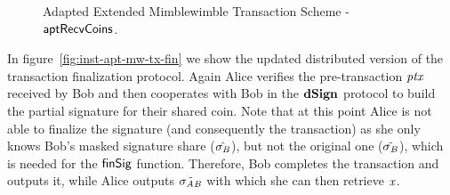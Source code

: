 \begin{figure}
    \begin{center}
    \end{center}
    \caption{Adapted Extended Mimblewimble Transaction Scheme - $\mathsf{aptRecvCoins}$. \label{fig:inst-apt-mw-tx-recv}}
\end{figure}

In figure~\cref{fig:inst-apt-mw-tx-fin} we show the updated distributed version of the transaction finalization protocol.
Again Alice verifies the pre-transaction $\mathit{ptx}$ received by Bob and then cooperates with Bob in the $\mathbf{dSign}$ protocol to build the partial signature for their shared coin.
Note that at this point Alice is not able to finalize the signature (and consequently the transaction) as she only knows Bob's masked signature share ($\hat{\sigma_{\mathit{B}}}$), but not the original one ($\tilde{\sigma_{\mathit{B}}}$), which is needed for the $\mathsf{finSig}$ function.
Therefore, Bob completes the transaction and outputs it, while Alice outputs $\tilde{\sigma_{\mathit{A}\mathit{B}}}$ with which she can then retrieve $\mathit{x}$.

